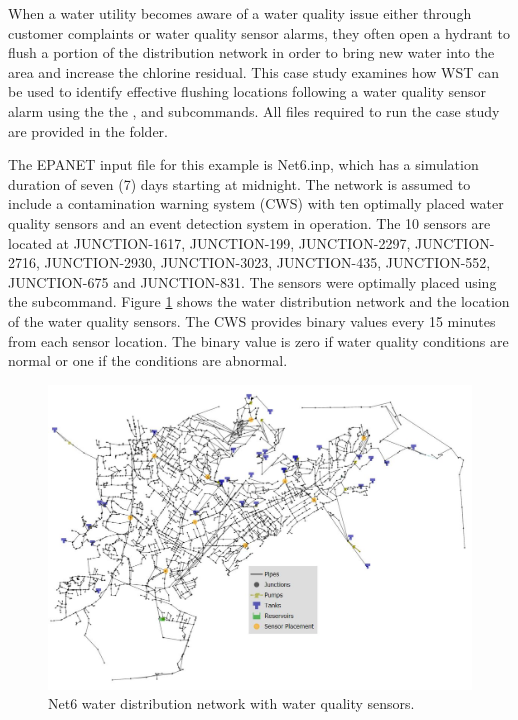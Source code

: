 \label{flushing_case_study}
When a water utility becomes aware of a water quality issue either through 
customer complaints or water quality sensor alarms, they often open a hydrant to 
flush a portion of the distribution network in order to bring new water into the 
area and increase the chlorine residual. This case study examines how WST can 
be used to identify effective flushing locations following a water quality 
sensor alarm using the the ,  and 
 subcommands. All files required to run the case study 
are provided in the  folder.

The EPANET input file for this example is Net6.inp, which has a simulation duration 
of seven (7) days starting at midnight. The network is assumed to include a contamination 
warning system (CWS) with ten optimally placed water quality sensors and an 
event detection system in operation. The 10 sensors are located at 
JUNCTION-1617, JUNCTION-199, JUNCTION-2297, 
JUNCTION-2716, JUNCTION-2930, JUNCTION-3023, JUNCTION-435, JUNCTION-552, 
JUNCTION-675 and JUNCTION-831. The sensors were optimally placed 
using the  subcommand. 
Figure \ref{fig:wds_sensors} shows the water distribution network and the location of the 
water quality sensors. The CWS provides binary values every 15 minutes from each sensor 
location. The binary value is zero if water quality conditions 
are normal or one if the conditions are abnormal.  

\begin{figure}[h!]
\begin{center}
\includegraphics[scale=0.6]{graphics/Net6_Sensors.JPG}
\caption{Net6 water distribution network with water quality sensors.}
\label{fig:wds_sensors}
\end{center}
\end{figure}
 
